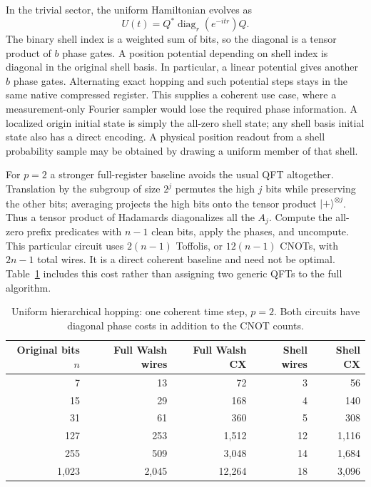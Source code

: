 \documentclass[11pt]{article}
\DeclareMathOperator{\diag}{diag}
\newcommand{\ket}[1]{\lvert #1\rangle}
\begin{document}
In the trivial sector, the uniform Hamiltonian evolves as
\begin{equation}
 U(t)=Q^*\diag_{r}(e^{-itr})Q.
\end{equation}
The binary shell index is a weighted sum of bits, so the diagonal is a tensor product of $b$ phase gates. A position potential depending on shell index is diagonal in the original shell basis. In particular, a linear potential gives another $b$ phase gates. Alternating exact hopping and such potential steps stays in the same native compressed register. This supplies a coherent use case, where a measurement-only Fourier sampler would lose the required phase information. A localized origin initial state is simply the all-zero shell state; any shell basis initial state also has a direct encoding. A physical position readout from a shell probability sample may be obtained by drawing a uniform member of that shell.

For $p=2$ a stronger full-register baseline avoids the usual QFT altogether. Translation by the subgroup of size $2^j$ permutes the high $j$ bits while preserving the other bits; averaging projects the high bits onto the tensor product $\ket{+}^{\otimes j}$. Thus a tensor product of Hadamards diagonalizes all the $A_j$. Compute the all-zero prefix predicates with $n-1$ clean bits, apply the phases, and uncompute. This particular circuit uses $2(n-1)$ Toffolis, or $12(n-1)$ CNOTs, with $2n-1$ total wires. It is a direct coherent baseline and need not be optimal. Table~\ref{tab:app} includes this cost rather than assigning two generic QFTs to the full algorithm.
\begin{table}[htbp]
\centering\small
\caption{Uniform hierarchical hopping: one coherent time step, $p=2$. Both circuits have diagonal phase costs in addition to the CNOT counts.}\label{tab:app}
\begin{tabular}{rrrrr}
\toprule
Original bits $n$ & Full Walsh wires & Full Walsh CX & Shell wires & Shell CX\\
\midrule
7 & 13 & 72 & 3 & 56\\
15 & 29 & 168 & 4 & 140\\
31 & 61 & 360 & 5 & 308\\
127 & 253 & 1,512 & 12 & 1,116\\
255 & 509 & 3,048 & 14 & 1,684\\
1,023 & 2,045 & 12,264 & 18 & 3,096\\
\bottomrule
\end{tabular}
\end{table}
\end{document}
